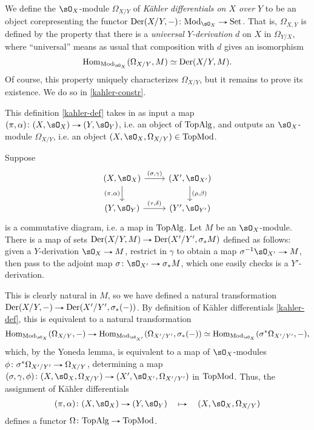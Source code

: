\begin{definition}
  \label{kahler-def}
  We define the $\sO_X$-module $\Omega_{X/Y}$ of \emph{K\"ahler differentials on $X$ over $Y$} to be an object corepresenting the functor $\Der(X/Y,-) \c \Mod_{\sO_X} \to \Set$. That is, $\Omega_{X,Y}$ is defined by the property that there is a \emph{universal $Y$-derivation} $d$ on $X$ in $\Omega_{Y/X}$, where ``universal'' means as usual that composition with $d$ gives an isomorphism
  \[
    \Hom_{\Mod_{\sO_X}}(\Omega_{X/Y}, M) \iso \Der(X/Y,M).
  \]
  Of course, this property uniquely characterizes $\Omega_{X/Y}$, but it remains to prove its existence. We do so in \cref{kahler-constr}.
\end{definition}

\begin{remark}
  \label{kahler-functor}
  This definition \cref{kahler-def} takes in as input a map $(\pi,\alpha) \c (X,\sO_X) \to (Y,\sO_Y)$, i.e. an object of $\mathrm{Top}\mathrm{Alg}$, and outputs an $\sO_X$-module $\Omega_{X/Y}$, i.e. an object $(X, \sO_X, \Omega_{X/Y}) \in \Top\Mod$.

  Suppose
  \[
    \begin{tikzcd}
      (X,\sO_X) \ar[r, "{(\sigma,\gamma)}"] \ar[d, "{(\pi,\alpha)}", swap] &
      (X',\sO_{X'}) \ar[d, "{(\rho,\beta)}"] \\
      (Y,\sO_Y) \ar[r, "{(\tau,\delta)}"] &
      (Y',\sO_{Y'})
    \end{tikzcd}
  \]
  is a commutative diagram, i.e. a map in $\mathrm{Top}\mathrm{Alg}$. Let $M$ be an $\sO_X$-module. There is a map of sets $\Der(X/Y,M) \to \Der(X'/Y',\sigma_*M)$ defined as follows: given a $Y$-derivation $\sO_X \to M$, restrict in $\gamma$ to obtain a map $\sigma^{-1}\sO_{X'} \to M$, then pass to the adjoint map $\sigma \c \sO_{X'} \to \sigma_*M$, which one easily checks is a $Y'$-derivation.

  This is clearly natural in $M$, so we have defined a natural transformation $\Der(X/Y,-) \to \Der(X'/Y',\sigma_*(-))$. By definition of K\"ahler differentials \cref{kahler-def}, this is equivalent to a natural transformation
  \[
    \Hom_{\Mod_{\sO_X}}(\Omega_{X/Y},-) \to
    \Hom_{\Mod_{\sO_{X'}}}(\Omega_{X'/Y'},\sigma_*(-)) \iso
    \Hom_{\Mod_{\sO_X}}(\sigma^*\Omega_{X'/Y'},-),
  \]
  which, by the Yoneda lemma, is equivalent to a map of $\sO_X$-modules $\phi \c \sigma^*\Omega_{X'/Y'} \to \Omega_{X/Y}$, determining a map $(\sigma,\gamma,\phi) \c (X, \sO_X, \Omega_{X/Y}) \to (X', \sO_{X'}, \Omega_{X'/Y'})$ in $\mathrm{Top}\mathrm{Mod}$. Thus, the assignment of K\"ahler differentials
  \[
    (\pi,\alpha) \c (X,\sO_X) \to (Y,\sO_Y)
    \quad \mapsto \quad
    (X, \sO_X, \Omega_{X/Y})
  \]
  defines a functor $\Omega \c \Top\Alg \to \Top\Mod$.
\end{remark}

